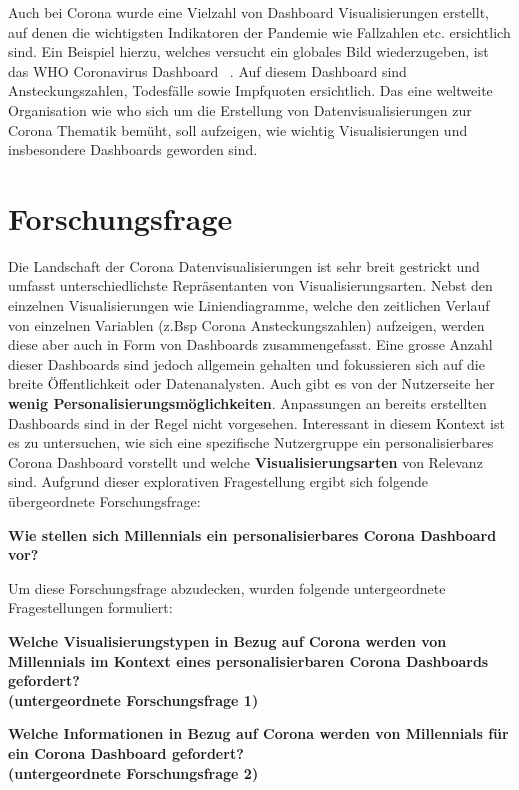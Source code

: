 \documentclass[12pt, oneside]{article}
\begin{document}
Auch bei Corona wurde eine Vielzahl von Dashboard Visualisierungen erstellt, auf denen die wichtigsten Indikatoren der Pandemie wie Fallzahlen etc. ersichtlich sind. Ein Beispiel hierzu, welches versucht ein globales Bild wiederzugeben, ist das WHO Coronavirus Dashboard ~\citep{WHO.23.04.2022}. Auf diesem Dashboard sind Ansteckungszahlen, Todesfälle sowie Impfquoten ersichtlich. Das eine weltweite Organisation wie \Gls{who} sich um die Erstellung von Datenvisualisierungen zur Corona Thematik bemüht, soll aufzeigen, wie wichtig Visualisierungen und insbesondere Dashboards geworden sind.
\clearpage

\section{Forschungsfrage}
Die Landschaft der Corona Datenvisualisierungen ist sehr breit gestrickt und umfasst unterschiedlichste Repräsentanten von Visualisierungsarten. Nebst den einzelnen Visualisierungen wie Liniendiagramme, welche den zeitlichen Verlauf von einzelnen Variablen (z.Bsp Corona Ansteckungszahlen) aufzeigen, werden diese aber auch in Form von Dashboards zusammengefasst. Eine grosse Anzahl dieser Dashboards sind jedoch  allgemein gehalten und fokussieren sich auf die breite Öffentlichkeit oder Datenanalysten. Auch gibt es von der Nutzerseite her \textbf{wenig Personalisierungsmöglichkeiten}. Anpassungen an bereits erstellten Dashboards sind in der Regel nicht vorgesehen. Interessant in diesem Kontext ist es zu untersuchen, wie sich eine spezifische Nutzergruppe ein personalisierbares Corona Dashboard vorstellt und welche \textbf{Visualisierungsarten} von Relevanz sind. Aufgrund dieser explorativen Fragestellung ergibt sich folgende übergeordnete Forschungsfrage:


\begin{center}
\textbf{Wie stellen sich Millennials ein personalisierbares Corona Dashboard vor?}
\end{center}

Um diese Forschungsfrage abzudecken, wurden folgende untergeordnete Fragestellungen formuliert:

\begin{center}
\textbf{Welche Visualisierungstypen in Bezug auf Corona werden von Millennials im Kontext eines personalisierbaren Corona Dashboards gefordert?\\
(untergeordnete Forschungsfrage 1)}
\end{center}

\begin{center}
\textbf{Welche Informationen in Bezug auf Corona werden von Millennials für ein Corona Dashboard gefordert?\\
(untergeordnete Forschungsfrage 2)}
\end{center}
\end{document}
